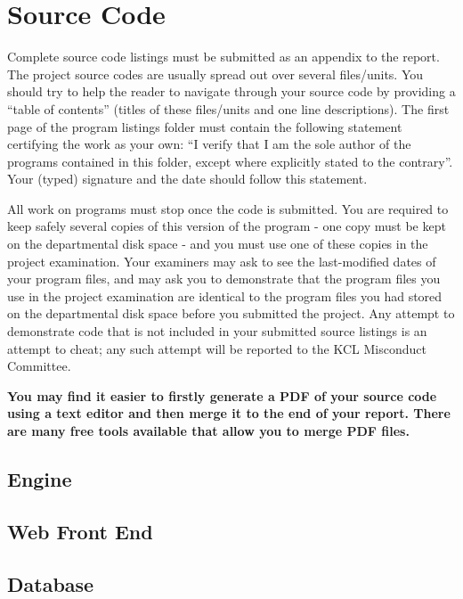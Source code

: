 \chapter{Source Code}
Complete source code listings must be submitted as an appendix to the report. The project source codes are usually spread out over several files/units. You should try to help the reader to navigate through your source code by providing a ``table of contents'' (titles of these files/units and one line descriptions). The first page of the program listings folder must contain the following statement certifying the work as your own: ``I verify that I am the sole author of the programs contained in this folder, except where explicitly stated to the contrary''. Your (typed) signature and the date should follow this statement.

All work on programs must stop once the code is submitted. You are required to keep safely several copies of this version of the program - one copy must be kept on the departmental disk space - and you must use one of these copies in the project examination. Your examiners may ask to see the last-modified dates of your program files, and may ask you to demonstrate that the program files you use in the project examination are identical to the program files you had stored on the departmental disk space before you submitted the project. Any attempt to demonstrate code that is not included in your submitted source listings is an attempt to cheat; any such attempt will be reported to the KCL Misconduct Committee.

\textbf{You may find it easier to firstly generate a PDF of your source code using a text editor and then merge it to the end of your report. There are many free tools available that allow you to merge PDF files.}


\section{Engine}
\section{Web Front End}
\section{Database}
